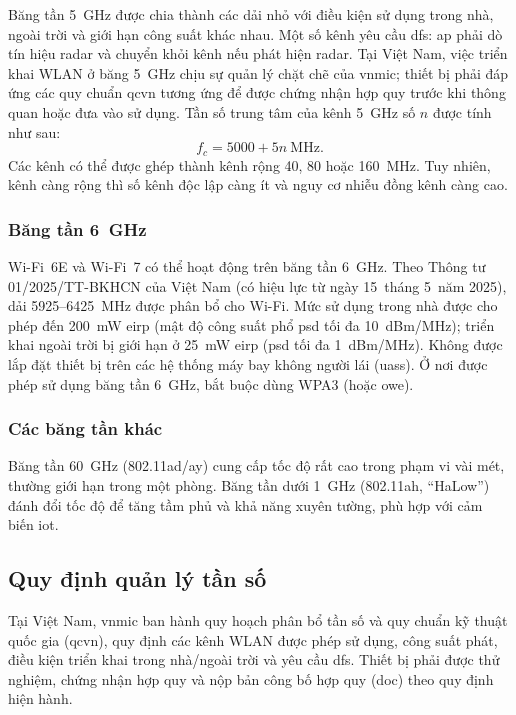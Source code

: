 Băng tần 5~GHz được chia thành các dải nhỏ với điều kiện sử dụng trong nhà,
ngoài trời và giới hạn công suất khác nhau. Một số kênh yêu cầu \ac{dfs}:
\ac{ap} phải dò tín hiệu radar và chuyển khỏi kênh nếu phát hiện radar. Tại
Việt Nam, việc triển khai WLAN ở băng 5~GHz chịu sự quản lý chặt chẽ của
\acs{vnmic}; thiết bị phải đáp ứng các quy chuẩn \acs{qcvn} tương ứng để được
chứng nhận hợp quy trước khi thông quan hoặc đưa vào sử dụng. Tần số trung tâm
của kênh 5~GHz số $n$ được tính như sau:
\begin{equation}
  f_c = 5000 + 5n \ \text{MHz}.
\end{equation}
Các kênh có thể được ghép thành kênh rộng 40, 80 hoặc 160~MHz. Tuy nhiên, kênh
càng rộng thì số kênh độc lập càng ít và nguy cơ nhiễu đồng kênh càng cao.

\subsubsection{Băng tần 6~GHz}

Wi-Fi~6E và Wi-Fi~7 có thể hoạt động trên băng tần 6~GHz. Theo Thông tư
01/2025/TT-BKHCN của Việt Nam (có hiệu lực từ ngày 15~tháng 5~năm 2025), dải
5925--6425~MHz được phân bổ cho Wi-Fi. Mức sử dụng trong nhà được cho phép đến
200~mW \ac{eirp} (mật độ công suất phổ \ac{psd} tối đa 10~dBm/MHz); triển khai
ngoài trời bị giới hạn ở 25~mW \ac{eirp} (\ac{psd} tối đa 1~dBm/MHz). Không
được lắp đặt thiết bị trên các hệ thống máy bay không người lái (\acp{uas}).
Ở nơi được phép sử dụng băng tần 6~GHz, bắt buộc dùng WPA3 (hoặc \ac{owe}).

\subsubsection{Các băng tần khác}

Băng tần 60~GHz (802.11ad/ay) cung cấp tốc độ rất cao trong phạm vi vài mét,
thường giới hạn trong một phòng. Băng tần dưới 1~GHz (802.11ah, ``HaLow'')
đánh đổi tốc độ để tăng tầm phủ và khả năng xuyên tường, phù hợp với cảm biến
\ac{iot}.

\subsection{Quy định quản lý tần số}

Tại Việt Nam, \ac{vnmic} ban hành quy hoạch phân bổ tần số và quy chuẩn kỹ
thuật quốc gia (\acs{qcvn}), quy định các kênh WLAN được phép sử dụng, công
suất phát, điều kiện triển khai trong nhà/ngoài trời và yêu cầu \ac{dfs}. Thiết
bị phải được thử nghiệm, chứng nhận hợp quy và nộp bản công bố hợp quy (\ac{doc})
theo quy định hiện hành.

